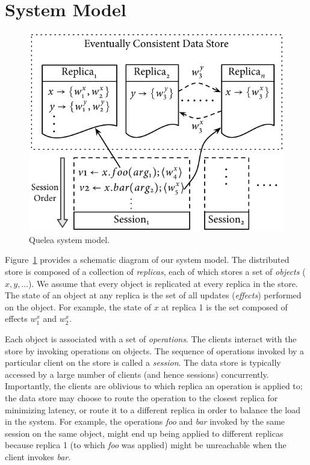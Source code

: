 \section{System Model}
\label{sec:sysmod}

\begin{figure}
\centering
\includegraphics[width=0.75\columnwidth]{Figures/SystemModel}
\caption{Quelea system model.}
\label{fig:sysmod}
\end{figure}

Figure~\ref{fig:sysmod} provides a schematic diagram of our system model. The
distributed store is composed of a collection of \emph{replicas}, each of which
stores a set of \emph{objects} ($x,y,\ldots$). We assume that every object is
replicated at every replica in the store. The state of an object at any replica
is the set of all updates (\emph{effects}) performed on the object. For
example, the state of $x$ at replica 1 is the set composed of effects $w^x_1$
and $w^x_2$.

Each object is associated with a set of \emph{operations}. The clients interact
with the store by invoking operations on objects. The sequence of operations
invoked by a particular client on the store is called a \emph{session}. The
data store is typically accessed by a large number of clients (and hence
sessions) concurrently. Importantly, the clients are oblivious to which replica
an operation is applied to; the data store may choose to route the operation to
the closest replica for minimizing latency, or route it to a different replica
in order to balance the load in the system. For example, the operations
\emph{foo} and \emph{bar} invoked by the same session on the same object, might
end up being applied to different replicas because replica 1 (to which
\emph{foo} was applied) might be unreachable when the client invokes
\emph{bar}.

